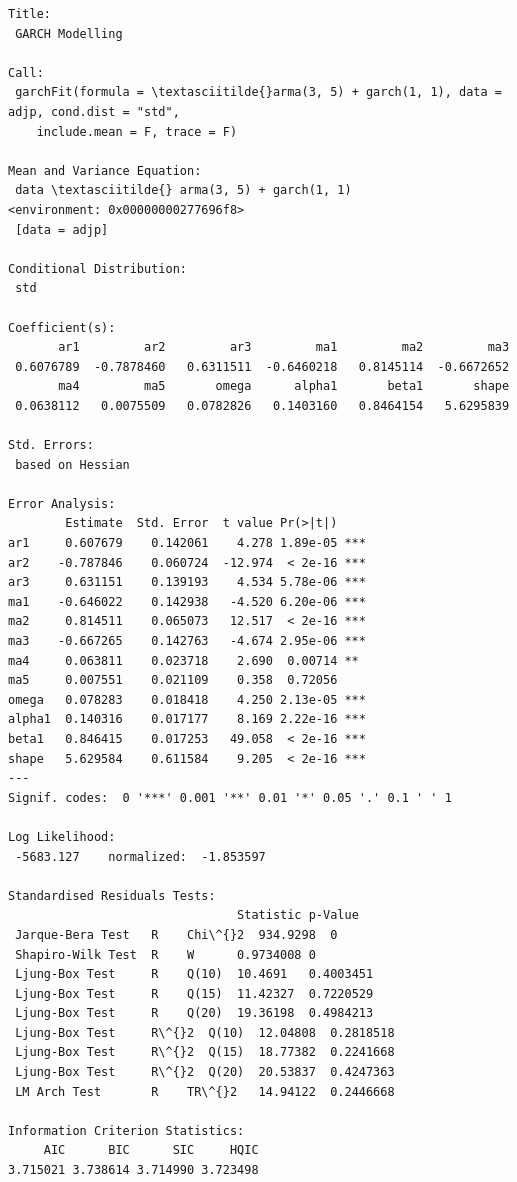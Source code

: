 \documentclass[12pt]{article}
\begin{document}
    \begin{Verbatim}[commandchars=\\\{\}]
Title:
 GARCH Modelling

Call:
 garchFit(formula = \textasciitilde{}arma(3, 5) + garch(1, 1), data = adjp, cond.dist = "std",
    include.mean = F, trace = F)

Mean and Variance Equation:
 data \textasciitilde{} arma(3, 5) + garch(1, 1)
<environment: 0x00000000277696f8>
 [data = adjp]

Conditional Distribution:
 std

Coefficient(s):
       ar1         ar2         ar3         ma1         ma2         ma3
 0.6076789  -0.7878460   0.6311511  -0.6460218   0.8145114  -0.6672652
       ma4         ma5       omega      alpha1       beta1       shape
 0.0638112   0.0075509   0.0782826   0.1403160   0.8464154   5.6295839

Std. Errors:
 based on Hessian

Error Analysis:
        Estimate  Std. Error  t value Pr(>|t|)
ar1     0.607679    0.142061    4.278 1.89e-05 ***
ar2    -0.787846    0.060724  -12.974  < 2e-16 ***
ar3     0.631151    0.139193    4.534 5.78e-06 ***
ma1    -0.646022    0.142938   -4.520 6.20e-06 ***
ma2     0.814511    0.065073   12.517  < 2e-16 ***
ma3    -0.667265    0.142763   -4.674 2.95e-06 ***
ma4     0.063811    0.023718    2.690  0.00714 **
ma5     0.007551    0.021109    0.358  0.72056
omega   0.078283    0.018418    4.250 2.13e-05 ***
alpha1  0.140316    0.017177    8.169 2.22e-16 ***
beta1   0.846415    0.017253   49.058  < 2e-16 ***
shape   5.629584    0.611584    9.205  < 2e-16 ***
---
Signif. codes:  0 '***' 0.001 '**' 0.01 '*' 0.05 '.' 0.1 ' ' 1

Log Likelihood:
 -5683.127    normalized:  -1.853597

Standardised Residuals Tests:
                                Statistic p-Value
 Jarque-Bera Test   R    Chi\^{}2  934.9298  0
 Shapiro-Wilk Test  R    W      0.9734008 0
 Ljung-Box Test     R    Q(10)  10.4691   0.4003451
 Ljung-Box Test     R    Q(15)  11.42327  0.7220529
 Ljung-Box Test     R    Q(20)  19.36198  0.4984213
 Ljung-Box Test     R\^{}2  Q(10)  12.04808  0.2818518
 Ljung-Box Test     R\^{}2  Q(15)  18.77382  0.2241668
 Ljung-Box Test     R\^{}2  Q(20)  20.53837  0.4247363
 LM Arch Test       R    TR\^{}2   14.94122  0.2446668

Information Criterion Statistics:
     AIC      BIC      SIC     HQIC
3.715021 3.738614 3.714990 3.723498
    \end{Verbatim}
\end{document}
